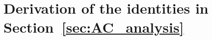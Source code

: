 \documentclass[12pt]{article}
\newcommand{\1}{\mathbf{1}}
\theoremstyle{plain}
\theoremstyle{definition}
\theoremstyle{remark}
\theoremstyle{plain}
\theoremstyle{remark}
\theoremstyle{plain}
\theoremstyle{plain}
\theoremstyle{plain}
\numberwithin{equation}{section}
\begin{document}
%

%




\appendix

\section{Derivation of the identities in Section~\ref{sec:AC_analysis}} \label{sec:autocorrelation_computation}
\end{document}
